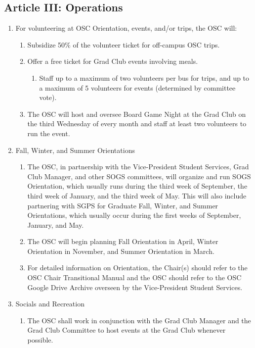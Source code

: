 \subsection{Article III: Operations}
\begin{enumerate}[label*=\arabic*., align=left]	
\item For volunteering at OSC Orientation, events, and/or trips, the OSC will:
\begin{enumerate}[label*=\arabic*., align=left]
\item Subsidize 50\% of the volunteer ticket for off-campus OSC trips.
\item Offer a free ticket for Grad Club events involving meals.
\begin{enumerate}[label*=\arabic*., align=left]
\item Staff up to a maximum of two volunteers per bus for trips, and up to a maximum of 5 volunteers for events (determined by committee vote).
\end{enumerate}
\item The OSC will host and oversee Board Game Night at the Grad Club on the third Wednesday of every month and staff at least two volunteers to run the event.
\end{enumerate}
\item Fall, Winter, and Summer Orientations
\begin{enumerate}[label*=\arabic*., align=left]
\item The OSC, in partnership with the Vice-President Student Services, Grad Club Manager, and other SOGS committees, will organize and run SOGS Orientation, which usually runs during the third week of September, the third week of January, and the third week of May. This will also include partnering with SGPS for Graduate Fall, Winter, and Summer Orientations, which usually occur during the first weeks of September, January, and May.
\item The OSC will begin planning Fall Orientation in April, Winter Orientation in November, and Summer Orientation in March.
\item For detailed information on Orientation, the Chair(s) should refer to the OSC Chair Transitional Manual and the OSC should refer to the OSC Google Drive Archive overseen by the Vice-President Student Services.
\end{enumerate}
\item Socials and Recreation
\begin{enumerate}[label*=\arabic*., align=left]
\item The OSC shall work in conjunction with the Grad Club Manager and the Grad Club Committee to host events at the Grad Club whenever possible.

\end{enumerate}
\end{enumerate}

